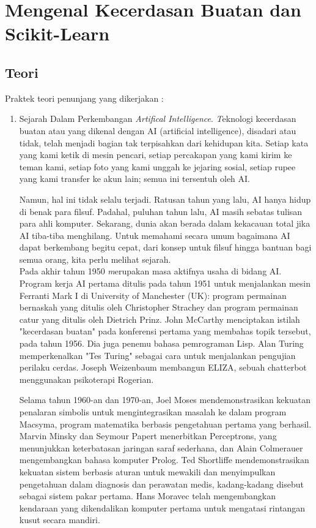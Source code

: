 \chapter{Mengenal Kecerdasan Buatan dan Scikit-Learn}

\section{Teori}
Praktek teori penunjang yang dikerjakan :
\begin{enumerate}
	\item Sejarah Dalam Perkembangan \textit{Artifical Intelligence}. \textit Teknologi kecerdasan buatan atau yang dikenal dengan AI (artificial intelligence), disadari atau tidak, telah menjadi bagian tak terpisahkan dari kehidupan kita. Setiap kata yang kami ketik di mesin pencari, setiap percakapan yang kami kirim ke teman kami, setiap foto yang kami unggah ke jejaring sosial, setiap rupee yang kami transfer ke akun lain; semua ini tersentuh oleh AI.
	
	Namun, hal ini tidak selalu terjadi. Ratusan tahun yang lalu, AI hanya hidup di benak para filsuf. Padahal, puluhan tahun  lalu, AI masih sebatas tulisan para ahli komputer. Sekarang, dunia akan berada dalam kekacauan total jika AI tiba-tiba menghilang. Untuk memahami secara umum bagaimana AI dapat berkembang begitu cepat, dari konsep untuk filsuf hingga bantuan bagi semua orang, kita perlu melihat sejarah.\\
	Pada akhir tahun 1950 \textit merupakan masa aktifnya usaha di bidang AI. Program kerja AI pertama  ditulis pada tahun 1951 untuk menjalankan mesin Ferranti Mark I di University of Manchester (UK):  program permainan bernaskah yang ditulis oleh Christopher Strachey dan program permainan catur yang ditulis oleh Dietrich Prinz. John McCarthy menciptakan istilah "kecerdasan buatan" pada konferensi pertama yang membahas topik tersebut, pada tahun 1956. Dia juga penemu bahasa pemrograman Lisp. Alan Turing memperkenalkan "Tes Turing" sebagai  cara untuk menjalankan pengujian perilaku cerdas. Joseph Weizenbaum membangun ELIZA, sebuah chatterbot menggunakan psikoterapi Rogerian.
	
	
	
	Selama tahun 1960-an dan 1970-an, Joel Moses mendemonstrasikan kekuatan penalaran simbolis untuk mengintegrasikan masalah ke dalam program Macsyma, program matematika berbasis pengetahuan pertama yang berhasil. Marvin Minsky dan Seymour Papert menerbitkan Perceptrons, yang menunjukkan keterbatasan jaringan saraf sederhana, dan Alain Colmerauer mengembangkan bahasa komputer Prolog. Ted Shortliffe mendemonstrasikan kekuatan sistem berbasis aturan untuk mewakili dan menyimpulkan pengetahuan dalam diagnosis dan perawatan medis, kadang-kadang disebut sebagai sistem pakar pertama. Hans Moravec telah mengembangkan kendaraan yang dikendalikan komputer pertama untuk mengatasi rintangan kusut secara mandiri.
	

\end{enumerate}
